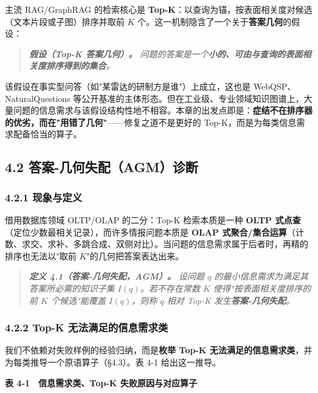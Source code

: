 \documentclass[12pt,a4paper]{ctexart}
\begin{document}
主流 RAG/GraphRAG 的检索核心是 \textbf{Top-K}：以查询为锚，按表面相关度对候选（文本片段或子图）排序并取前 $K$ 个。这一机制隐含了一个关于\textbf{答案几何}的假设：

\begin{quote}\itshape \textbf{假设（Top-K 答案几何）。} 问题的答案是一个\textbf{小的、可由与查询的表面相关度排序得到的集合}。\end{quote}

该假设在事实型问答（如"某雷达的研制方是谁"）上成立，这也是 WebQSP、NaturalQuestions 等公开基准的主体形态。但在工业级、专业领域知识图谱上，大量问题的信息需求与该假设结构性地不相容。本章的出发点即是：\textbf{症结不在排序器的优劣，而在"用错了几何"}——修复之道不是更好的 Top-K，而是为每类信息需求配备恰当的算子。

\subsection*{4.2 答案-几何失配（AGM）诊断}

\subsubsection*{4.2.1 现象与定义}

借用数据库领域 OLTP/OLAP 的二分：Top-K 检索本质是一种 \textbf{OLTP 式点查}（定位少数最相关记录），而许多情报问题本质是 \textbf{OLAP 式聚合/集合运算}（计数、求交、求补、多跳合成、双侧对比）。当问题的信息需求属于后者时，再精的排序也无法以"取前 $K$"的几何把答案表达出来。

\begin{quote}\itshape \textbf{定义 4.1（答案-几何失配，AGM）。} 设问题 $q$ 的最小信息需求为满足其答案所必需的知识子集 $I(q)$。若不存在常数 $K$ 使得"按表面相关度排序的前 $K$ 个候选"能覆盖 $I(q)$，则称 $q$ 相对 Top-K 发生\textbf{答案-几何失配}。\end{quote}

\subsubsection*{4.2.2 Top-K 无法满足的信息需求类}

我们不依赖对失败样例的经验归纳，而是\textbf{枚举 Top-K 无法满足的信息需求类}，并为每类推导一个原语算子（§4.3）。表 4-1 给出这一推导。

\textbf{表 4-1　信息需求类、Top-K 失败原因与对应算子}
\end{document}
